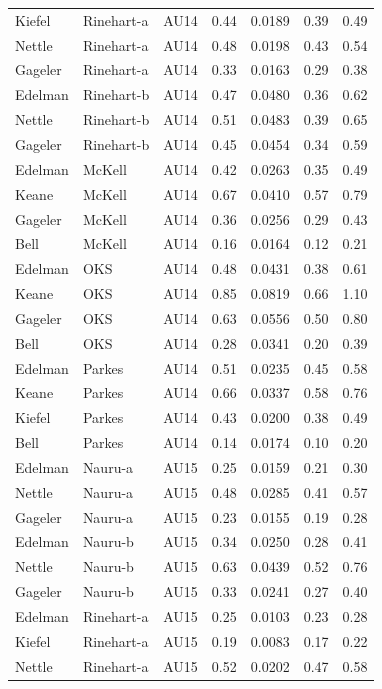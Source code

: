 \documentclass{monashthesis}
\begin{document}
\begin{center}
\begin{longtable}{lllllll}
Kiefel & Rinehart-a & AU14 & 0.44 & 0.0189 & 0.39 & 0.49 \\
Nettle & Rinehart-a & AU14 & 0.48 & 0.0198 & 0.43 & 0.54 \\
Gageler & Rinehart-a & AU14 & 0.33 & 0.0163 & 0.29 & 0.38 \\
Edelman & Rinehart-b & AU14 & 0.47 & 0.0480 & 0.36 & 0.62 \\
Nettle & Rinehart-b & AU14 & 0.51 & 0.0483 & 0.39 & 0.65 \\
Gageler & Rinehart-b & AU14 & 0.45 & 0.0454 & 0.34 & 0.59 \\
Edelman & McKell & AU14 & 0.42 & 0.0263 & 0.35 & 0.49 \\
Keane & McKell & AU14 & 0.67 & 0.0410 & 0.57 & 0.79 \\
Gageler & McKell & AU14 & 0.36 & 0.0256 & 0.29 & 0.43 \\
Bell & McKell & AU14 & 0.16 & 0.0164 & 0.12 & 0.21 \\
Edelman & OKS & AU14 & 0.48 & 0.0431 & 0.38 & 0.61 \\
Keane & OKS & AU14 & 0.85 & 0.0819 & 0.66 & 1.10 \\
Gageler & OKS & AU14 & 0.63 & 0.0556 & 0.50 & 0.80 \\
Bell & OKS & AU14 & 0.28 & 0.0341 & 0.20 & 0.39 \\
Edelman & Parkes & AU14 & 0.51 & 0.0235 & 0.45 & 0.58 \\
Keane & Parkes & AU14 & 0.66 & 0.0337 & 0.58 & 0.76 \\
Kiefel & Parkes & AU14 & 0.43 & 0.0200 & 0.38 & 0.49 \\
Bell & Parkes & AU14 & 0.14 & 0.0174 & 0.10 & 0.20 \\
Edelman & Nauru-a & AU15 & 0.25 & 0.0159 & 0.21 & 0.30 \\
Nettle & Nauru-a & AU15 & 0.48 & 0.0285 & 0.41 & 0.57 \\
Gageler & Nauru-a & AU15 & 0.23 & 0.0155 & 0.19 & 0.28 \\
Edelman & Nauru-b & AU15 & 0.34 & 0.0250 & 0.28 & 0.41 \\
Nettle & Nauru-b & AU15 & 0.63 & 0.0439 & 0.52 & 0.76 \\
Gageler & Nauru-b & AU15 & 0.33 & 0.0241 & 0.27 & 0.40 \\
Edelman & Rinehart-a & AU15 & 0.25 & 0.0103 & 0.23 & 0.28 \\
Kiefel & Rinehart-a & AU15 & 0.19 & 0.0083 & 0.17 & 0.22 \\
Nettle & Rinehart-a & AU15 & 0.52 & 0.0202 & 0.47 & 0.58 \\

\end{longtable}
\end{center}
\end{document}
